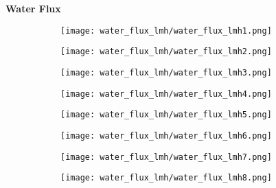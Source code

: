 \documentclass{article}
\begin{document}
    \textbf{Water Flux}
    \begin{figure}[H]
        \centering
        \begin{subfigure}{0.48\linewidth}
		    \texttt{[image: water\_flux\_lmh/water\_flux\_lmh1.png]}
	    \end{subfigure}
	    \begin{subfigure}{0.48\linewidth}
		    \texttt{[image: water\_flux\_lmh/water\_flux\_lmh2.png]}
	    \end{subfigure}
	    \begin{subfigure}{0.48\linewidth}
		    \texttt{[image: water\_flux\_lmh/water\_flux\_lmh3.png]}
	    \end{subfigure}
	    \begin{subfigure}{0.48\linewidth}
		    \texttt{[image: water\_flux\_lmh/water\_flux\_lmh4.png]}
	    \end{subfigure}
	    \begin{subfigure}{0.48\linewidth}
		    \texttt{[image: water\_flux\_lmh/water\_flux\_lmh5.png]}
	    \end{subfigure}
	    \begin{subfigure}{0.48\linewidth}
		    \texttt{[image: water\_flux\_lmh/water\_flux\_lmh6.png]}
	    \end{subfigure}
	    \begin{subfigure}{0.48\linewidth}
		    \texttt{[image: water\_flux\_lmh/water\_flux\_lmh7.png]}
	    \end{subfigure}
	    \begin{subfigure}{0.48\linewidth}
		    \texttt{[image: water\_flux\_lmh/water\_flux\_lmh8.png]}
	    \end{subfigure}
    \end{figure}
    
    \pagebreak
    
\end{document}
